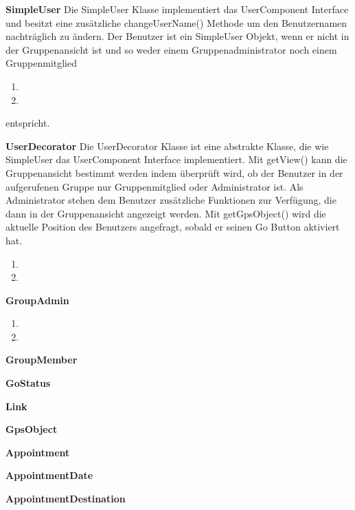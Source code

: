 \textbf{SimpleUser}
Die SimpleUser Klasse implementiert das UserComponent Interface und besitzt eine zusätzliche changeUserName() Methode um den Benutzernamen nachträglich zu ändern. Der Benutzer ist ein SimpleUser Objekt, wenn er nicht in der Gruppenansicht ist und so weder einem Gruppenadministrator noch einem Gruppenmitglied
\begin{enumerate}
	\item
	\item
\end{enumerate}
 entspricht.

\textbf{UserDecorator}
Die UserDecorator Klasse ist eine abstrakte Klasse, die wie SimpleUser das UserComponent Interface implementiert. 
Mit getView() kann die Gruppenansicht bestimmt werden indem überprüft wird, ob der Benutzer in der aufgerufenen Gruppe nur Gruppenmitglied oder Administrator ist. Als Administrator stehen dem Benutzer zusätzliche Funktionen zur Verfügung, die dann in der Gruppenansicht angezeigt werden.
Mit getGpsObject() wird die aktuelle Position des Benutzers angefragt, sobald er seinen Go Button aktiviert hat.
\begin{enumerate}
	\item
	\item
\end{enumerate}


\textbf{GroupAdmin}
\begin{enumerate}
	\item
	\item
\end{enumerate}

\textbf{GroupMember}


\textbf{GoStatus}

\textbf{Link}

\textbf{GpsObject}


\textbf{Appointment}

\textbf{AppointmentDate}

\textbf{AppointmentDestination}








